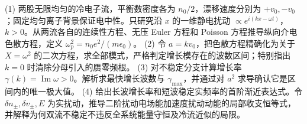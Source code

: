 (1) 两股无限均匀的冷电子流，平衡数密度各为 \(n_0/2\)，漂移速度分别为 \(+v_0,-v_0\)；固定均匀离子背景保证电中性。只研究沿 \(x\) 的一维静电扰动 \(\propto e^{i(kx-\omega t)}\)，\(k>0\)。从两流各自的连续性方程、无压 Euler 方程和 Poisson 方程推导纵向介电色散方程，定义 \(\omega_p^2=n_0e^2/(m\epsilon_0)\)。
(2) 令 \(a=kv_0\)，把色散方程精确化为关于 \(X=\omega^2\) 的二次方程，求全部模式，严格判定增长模存在的波数区间；特别指出 \(k=0\) 时清除分母引入的赝零频根。
(3) 对不稳定分支计算增长率 \(\gamma(k)=\operatorname{Im}\omega>0\)。解析求最快增长波数与 \(\gamma_{\max}\)，并通过对 \(a^2\) 求导确认它是区间内的唯一极大值。
(4) 给出长波增长率和短波稳定实频率的首阶渐近表达式。令 \(\delta n_\pm,\delta v_\pm,E\) 为实扰动，推导二阶扰动电场能加速度扰动动能的局部收支恒等式，并解释为何双流不稳定不违反全系统能量守恒及冷流近似的局限。